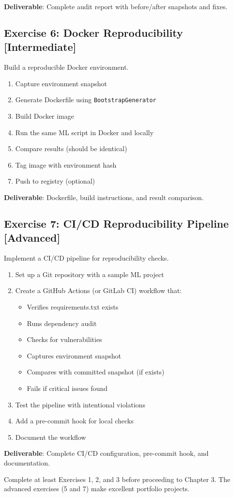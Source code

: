 \textbf{Deliverable}: Complete audit report with before/after snapshots and fixes.

\subsection{Exercise 6: Docker Reproducibility [Intermediate]}

Build a reproducible Docker environment.

\begin{enumerate}
    \item Capture environment snapshot
    \item Generate Dockerfile using \texttt{BootstrapGenerator}
    \item Build Docker image
    \item Run the same ML script in Docker and locally
    \item Compare results (should be identical)
    \item Tag image with environment hash
    \item Push to registry (optional)
\end{enumerate}

\textbf{Deliverable}: Dockerfile, build instructions, and result comparison.

\subsection{Exercise 7: CI/CD Reproducibility Pipeline [Advanced]}

Implement a CI/CD pipeline for reproducibility checks.

\begin{enumerate}
    \item Set up a Git repository with a sample ML project
    \item Create a GitHub Actions (or GitLab CI) workflow that:
    \begin{itemize}
        \item Verifies requirements.txt exists
        \item Runs dependency audit
        \item Checks for vulnerabilities
        \item Captures environment snapshot
        \item Compares with committed snapshot (if exists)
        \item Fails if critical issues found
    \end{itemize}
    \item Test the pipeline with intentional violations
    \item Add a pre-commit hook for local checks
    \item Document the workflow
\end{enumerate}

\textbf{Deliverable}: Complete CI/CD configuration, pre-commit hook, and documentation.

\vspace{1cm}

Complete at least Exercises 1, 2, and 3 before proceeding to Chapter 3. The advanced exercises (5 and 7) make excellent portfolio projects.

